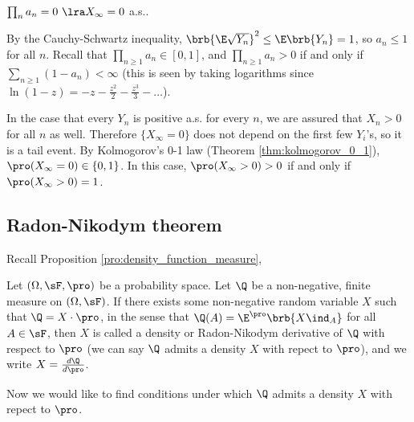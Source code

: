 \begin{remark}
$\prod_n a_n = 0 \ \lra X_\infty = 0$ a.s..

By the Cauchy-Schwartz inequality, $\brb{\E\sqrt{Y_n}}^2 \leq \E\brb{Y_n} = 1$, so $a_n \leq 1$ for all $n$. Recall that $\prod_{n\geq 1} a_n \in [0, 1]$, and $\prod_{n\geq 1} a_n > 0$ if and only if $\sum_{n\geq 1}(1 - a_n)
< \infty$ (this is seen by taking logarithms since $\ln (1-z) = -z - \frac {z^2}2 - \frac{z^3}3 - \dots$).
\end{remark}


\begin{remark}
In the case that every $Y_n$ is positive a.s. for every $n$, we are assured that $X_n > 0$ for all $n$ as well. Therefore $\{X_\infty = 0\}$ does not depend on the first few $Y_i$'s, so it is a tail event. By Kolmogorov's 0-1 law (Theorem \ref{thm:kolmogorov_0_1}), $\pro(X_\infty = 0) \in \{0, 1\}$. In this case, $\pro(X_\infty > 0) > 0$ if and only if $\pro(X_\infty > 0) = 1$.
\end{remark}




\subsection{Radon-Nikodym theorem}

Recall Proposition \ref{pro:density_function_measure},

\begin{definition}\label{def:radon_nikodym_derivative}
Let $(\Omega,\sF, \pro)$ be a probability space. Let $\Q$ be a non-negative, finite measure on $(\Omega,\sF)$. If there exists some non-negative random variable $X$ such that $\Q = X \cdot \pro$, in the sense that $\Q(A) = \E^\pro\brb{X\ind_A}$ for all $A \in \sF$, then $X$ is called a density or Radon-Nikodym derivative of $\Q$ with respect to $\pro$ (we can say $\Q$ admits a density $X$ with repect to $\pro$), and we write $X = \frac{d\Q}{d\pro}$.
\end{definition}

Now we would like to find conditions under which $\Q$ admits a density $X$ with repect to $\pro$.



